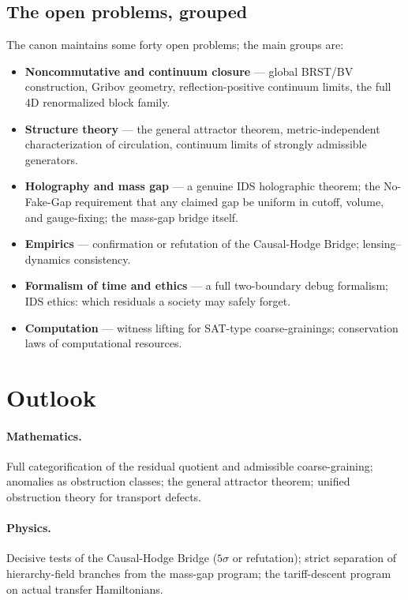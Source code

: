 \documentclass[11pt,a4paper]{article}
\theoremstyle{plain}
\begin{document}
\subsection{The open problems, grouped}

The canon maintains some forty open problems; the main groups are:
\begin{itemize}[itemsep=2pt,topsep=3pt]
\item \textbf{Noncommutative and continuum closure} --- global BRST/BV construction, Gribov geometry, reflection-positive continuum limits, the full 4D renormalized block family.
\item \textbf{Structure theory} --- the general attractor theorem, metric-independent characterization of circulation, continuum limits of strongly admissible generators.
\item \textbf{Holography and mass gap} --- a genuine IDS holographic theorem; the No-Fake-Gap requirement that any claimed gap be uniform in cutoff, volume, and gauge-fixing; the mass-gap bridge itself.
\item \textbf{Empirics} --- confirmation or refutation of the Causal-Hodge Bridge; lensing--dynamics consistency.
\item \textbf{Formalism of time and ethics} --- a full two-boundary debug formalism; IDS ethics: which residuals a society may safely forget.
\item \textbf{Computation} --- witness lifting for SAT-type coarse-grainings; conservation laws of computational resources.
\end{itemize}

\section{Outlook}\label{sec:outlook}

\paragraph{Mathematics.} Full categorification of the residual quotient and admissible coarse-graining; anomalies as obstruction classes; the general attractor theorem; unified obstruction theory for transport defects.

\paragraph{Physics.} Decisive tests of the Causal-Hodge Bridge ($5\sigma$ or refutation); strict separation of hierarchy-field branches from the mass-gap program; the tariff-descent program on actual transfer Hamiltonians.
\end{document}
